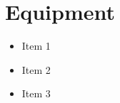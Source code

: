 \documentclass[../Lab.tex]{subfiles}
\begin{document}
\section{Equipment}
\begin{itemize}
   \item Item 1
   \item Item 2
   \item Item 3
\end{itemize}
\end{document}
